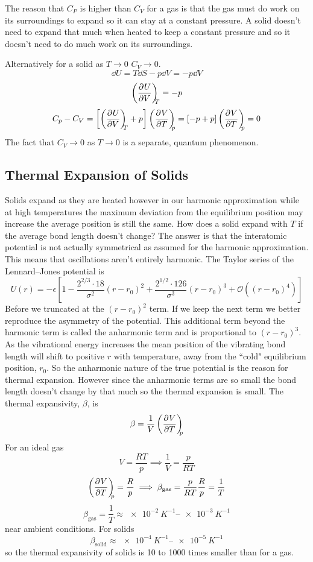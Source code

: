     The reason that \(C_P\) is higher than \(C_V\) for a gas is that the gas must do work on its surroundings to expand so it can stay at a constant pressure.
    A solid doesn't need to expand that much when heated to keep a constant pressure and so it doesn't need to do much work on its surroundings.
    
    Alternatively for a solid as \(T\to 0\) \(C_V\to 0\).
    \[\dd U = T\dd S - p\dd V = -p\dd V\]
    \[\left(\pdv[]{U}{V}\right)_{\!\!\!{T}} = -p\]
    \[C_p - C_V = \left[\pdvconst{U}{V}{T} + p\right]\pdvconst{V}{T}{p} = \left[-p + p\right]\pdvconst{V}{T}{p} = 0\]
    The fact that \(C_V\to 0\) as \(T\to 0\) is a separate, quantum phenomenon.
    
    \subsection{Thermal Expansion of Solids}
    Solids expand as they are heated however in our harmonic approximation while at high temperatures the maximum deviation from the equilibrium position may increase the average position is still the same.
    How does a solid expand with \(T\) if the average bond length doesn't change?
    The answer is that the interatomic potential is not actually symmetrical as assumed for the harmonic approximation.
    This means that oscillations aren't entirely harmonic.
    The Taylor series of the Lennard--Jones potential is
    \[U(r) = -\epsilon\left[1 - \frac{2^{2/3}\cdot 18}{\sigma^2}(r - r_0)^2 + \frac{2^{1/2}\cdot 126}{\sigma^3}(r - r_0)^3 + \mathcal{O}\left((r - r_0)^4\right)\right]\]
    Before we truncated at the \((r - r_0)^2\) term.
    If we keep the next term we better reproduce the asymmetry of the potential.
    This additional term beyond the harmonic term is called the anharmonic term and is proportional to \((r - r_0)^3\).
    As the vibrational energy increases the mean position of the vibrating bond length will shift to positive \(r\) with temperature, away from the ``cold" equilibrium position, \(r_0\).
    So the anharmonic nature of the true potential is the reason for thermal expansion.
    However since the anharmonic terms are so small the bond length doesn't change by that much so the thermal expansion is small.
    The thermal expansivity, \(\beta\), is
    \[\beta = \frac{1}{V}\left(\pdv[]{V}{T}\right)_{\!\!\!{p}}\]
    For an ideal gas
    \[V = \frac{RT}{p}\implies \frac{1}{V} = \frac{p}{RT}\]
    \[\left(\pdv[]{V}{T}\right)_{\!\!\!{p}} = \frac{R}{p}\implies \beta_\text{gas} =  \frac{p}{RT}\frac{R}{p} = \frac{1}{T}\]
    \[\beta_\text{gas} = \frac{1}{T} \approx \SIrange[range-phrase=-]{e-2}{e-3}{K^{-1}}\]
    near ambient conditions.
    For solids
    \[\beta_\text{solid} \approx \SIrange[range-phrase=-]{e-4}{e-5}{K^{-1}}\]
    so the thermal expansivity of solids is 10 to 1000 times smaller than for a gas.
    
